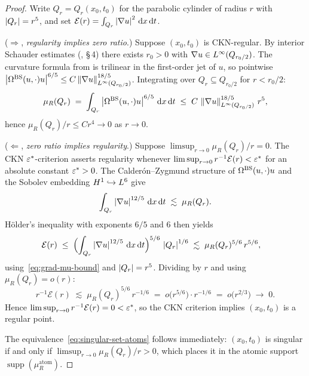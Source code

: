 \begin{proof}
Write $Q_r = Q_r(x_0,t_0)$ for the parabolic cylinder of radius $r$ with $\left\lvert Q_r \right\rvert = r^5$,
and set $\mathcal{E}(r) = \int_{Q_r} \left\lvert \nabla u \right\rvert^2\,\mathrm{d} x\,\mathrm{d} t$.

\medskip\noindent($\Rightarrow$, \textit{regularity implies zero ratio}.)
Suppose $(x_0,t_0)$ is CKN-regular.  By interior Schauder estimates
(\cite{caffarelli1982partial}, \S\,4) there exists $r_0 > 0$ with
$\nabla u \in L^{\infty}(Q_{r_0/2})$.
The curvature formula from  is trilinear in the first-order jet of $u$,
so pointwise $\left\lvert \Omega^{\mathrm{BS}}(u,\cdot)u \right\rvert^{6/5} \leq C\left\lVert \nabla u \right\rVert^{18/5}_{L^{\infty}(Q_{r_0/2})}$.
Integrating over $Q_r \subseteq Q_{r_0/2}$ for $r < r_0/2$:
\[
  \mu_R(Q_r)
  \;=\; \int_{Q_r} \left\lvert \Omega^{\mathrm{BS}}(u,\cdot)u \right\rvert^{6/5}\,\mathrm{d} x\,\mathrm{d} t
  \;\leq\; C\,\left\lVert \nabla u \right\rVert^{18/5}_{L^{\infty}(Q_{r_0/2})}\,r^5,
\]
hence $\mu_R(Q_r)/r \leq C r^4 \to 0$ as $r \to 0$.

\medskip\noindent($\Leftarrow$, \textit{zero ratio implies regularity}.)
Suppose $\limsup_{r\to 0}\mu_R(Q_r)/r = 0$.
The CKN $\varepsilon^*$-criterion \cite{caffarelli1982partial} asserts regularity whenever
$\limsup_{r\to 0}r^{-1}\mathcal{E}(r) < \varepsilon^*$ for an absolute constant $\varepsilon^* > 0$.
The Calder\'{o}n--Zygmund structure of $\Omega^{\mathrm{BS}}(u,\cdot)u$ and the Sobolev embedding
$H^{1} \hookrightarrow L^{6}$ give
\begin{equation}\label{eq:grad-mu-bound}
  \int_{Q_r} \left\lvert \nabla u \right\rvert^{12/5}\,\mathrm{d} x\,\mathrm{d} t \;\lesssim\; \mu_R(Q_r).
\end{equation}
H\"{o}lder's inequality with exponents $6/5$ and $6$ then yields
\begin{align*}
  \mathcal{E}(r)
  &\;\leq\;
  \Bigl(\int_{Q_r} \left\lvert \nabla u \right\rvert^{12/5}\,\mathrm{d} x\,\mathrm{d} t\Bigr)^{5/6}
  \,\left\lvert Q_r \right\rvert^{1/6}
  \;\lesssim\;
  \mu_R(Q_r)^{5/6}\,r^{5/6},
\end{align*}
using~\eqref{eq:grad-mu-bound} and $\left\lvert Q_r \right\rvert = r^5$.  Dividing by $r$ and using
$\mu_R(Q_r) = o(r)$:
\[
  r^{-1}\mathcal{E}(r) \;\lesssim\; \mu_R(Q_r)^{5/6}\,r^{-1/6}
  \;=\; o\!\bigl(r^{5/6}\bigr)\cdot r^{-1/6} \;=\; o\!\bigl(r^{2/3}\bigr) \;\to\; 0.
\]
Hence $\limsup_{r\to 0}r^{-1}\mathcal{E}(r) = 0 < \varepsilon^*$, so the CKN criterion
implies $(x_0,t_0)$ is a regular point.

\medskip
The equivalence~\eqref{eq:singular-set-atoms} follows immediately: $(x_0,t_0)$ is singular
if and only if $\limsup_{r\to 0}\mu_R(Q_r)/r > 0$, which places it in the atomic
support $\operatorname{supp}(\mu_R^{\mathrm{atom}})$.
\end{proof}

